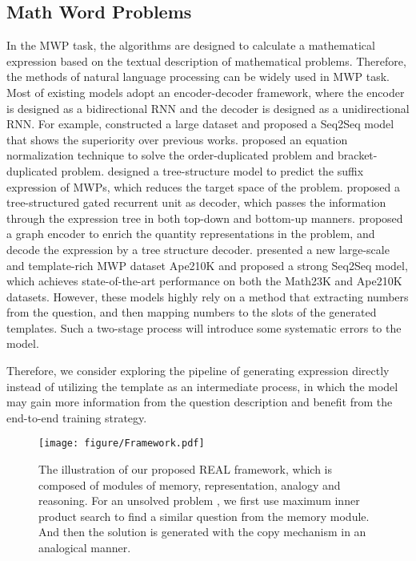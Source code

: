 \documentclass[11pt, a4paper]{article}
\begin{document}
\subsection{Math Word Problems}
In the MWP task, the algorithms are designed to calculate a mathematical expression based on the textual description of mathematical problems. Therefore, the methods of natural language processing can be widely used in MWP task. Most of existing models adopt an encoder-decoder framework, where the encoder is designed as a bidirectional RNN and the decoder is designed as a unidirectional RNN. For example, \citet{wang2017deep} constructed a large dataset and proposed a Seq2Seq model that shows the superiority over previous works. \citet{wang2018translating} proposed an equation normalization technique to solve the order-duplicated problem and bracket-duplicated problem. \citet{wang2019template} designed a tree-structure model to predict the suffix expression of MWPs, which reduces the target space of the problem. \citet{xie2019goal} proposed a tree-structured gated recurrent unit as decoder, which passes the information through the expression tree in both top-down and bottom-up manners. \citet{zhang2020graph} proposed a graph encoder to enrich the quantity representations in the problem, and decode the expression by a tree structure decoder. \citet{zhao2020ape210k} presented a new large-scale and template-rich MWP dataset Ape210K and proposed a strong Seq2Seq model, which achieves state-of-the-art performance on both the Math23K and Ape210K datasets. However, these models highly rely on a method that extracting numbers from the question, and then mapping numbers to the slots of the generated templates. Such a two-stage process will introduce some systematic errors to the model. 

Therefore, we consider exploring the pipeline of generating expression directly instead of utilizing the template as an intermediate process, in which the model may gain more information from the question description and benefit from the end-to-end training strategy. 

\begin{figure*}[th]
  \centering
  \texttt{[image: figure/Framework.pdf]}
  \vspace{-0.2cm}
  \caption{The illustration of our proposed REAL framework, which is composed of modules of memory, representation, analogy and reasoning. For an unsolved problem , we first use maximum inner product search to find a similar question  from the memory module. And then the solution is generated with the copy mechanism in an analogical manner.}
  \label{fig:framework}
\end{figure*}
\end{document}
